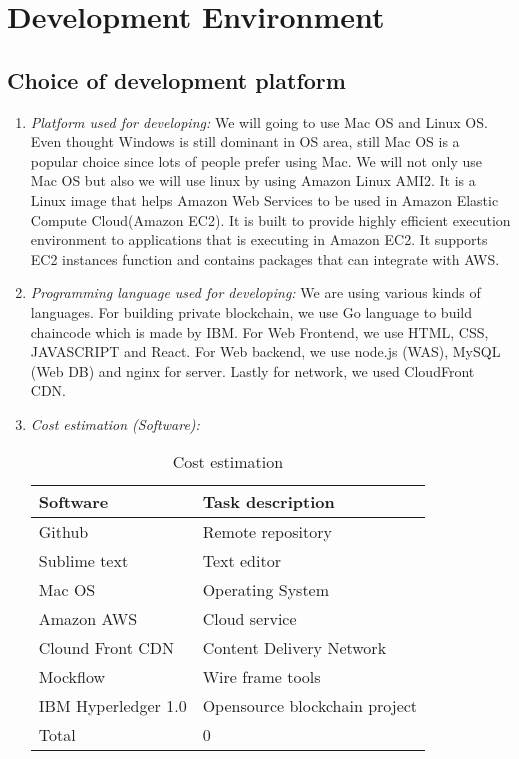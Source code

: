 \documentclass[conference]{IEEEtran}
\begin{document}
\section{Development Environment}
\subsection{Choice of development platform}
\begin{enumerate} [font=\itshape]
  \item \textit{Platform used for developing: }We will going to use Mac OS and Linux OS. Even thought Windows is still dominant in OS area, still Mac OS is a popular choice since lots of people prefer using Mac. We will not only use Mac OS but also we will use linux by using Amazon Linux AMI2. It is a Linux image that helps Amazon Web Services to be used in Amazon Elastic Compute Cloud(Amazon EC2). It is built to provide highly efficient execution environment to applications that is executing in Amazon EC2. It supports EC2 instances function and contains packages that can integrate with AWS.\\
  
   \item \textit{Programming language used for developing: }We are using various kinds of languages. For building private blockchain, we use Go language to build chaincode which is made by IBM. For Web Frontend, we use HTML, CSS, JAVASCRIPT and React. For Web backend, we use node.js (WAS), MySQL (Web DB) and nginx for server. Lastly for network, we used CloudFront CDN. 
   
  \item \textit{Cost estimation (Software): } 
  \begin{table}[htbp]
  \renewcommand{\arraystretch}{1.5}
\caption{Cost estimation}
\begin{center}
\begin{tabular}{|p{3cm}|p{4.7cm}|}
\hline
\textbf{Software         } & \textbf{Task description        } \\
\hline
Github & Remote repository \\
\hline
Sublime text & Text editor \\
\hline
Mac OS & Operating System \\
\hline
Amazon AWS  & Cloud service \\
\hline
Clound Front CDN & Content Delivery Network \\
\hline
 Mockflow & Wire frame tools \\
\hline
IBM Hyperledger 1.0 & Opensource blockchain project \\
\hline
Total & 0 \\
\hline
\end{tabular}
\label{tab1}
\end{center}
\end{table}
\end{enumerate}
\end{document}
